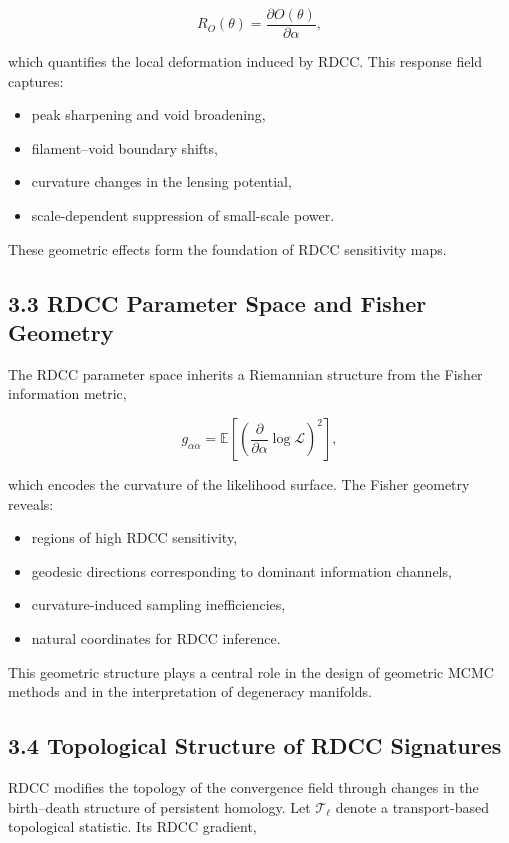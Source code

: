 \documentclass[11pt,a4paper]{article}
\begin{document}
\[
    R_{O}(\theta)
    =
    \frac{\partial O(\theta)}{\partial \alpha},
\]


which quantifies the local deformation induced by RDCC. This response field 
captures:

\begin{itemize}
    \item peak sharpening and void broadening,
    \item filament–void boundary shifts,
    \item curvature changes in the lensing potential,
    \item scale-dependent suppression of small-scale power.
\end{itemize}

These geometric effects form the foundation of RDCC sensitivity maps.

\subsection*{3.3 RDCC Parameter Space and Fisher Geometry}

The RDCC parameter space inherits a Riemannian structure from the Fisher 
information metric,


\[
    g_{\alpha\alpha}
    =
    \mathbb{E}
    \left[
        \left(
            \frac{\partial}{\partial \alpha}
            \log \mathcal{L}
        \right)^{2}
    \right],
\]


which encodes the curvature of the likelihood surface. The Fisher geometry 
reveals:

\begin{itemize}
    \item regions of high RDCC sensitivity,
    \item geodesic directions corresponding to dominant information channels,
    \item curvature-induced sampling inefficiencies,
    \item natural coordinates for RDCC inference.
\end{itemize}

This geometric structure plays a central role in the design of geometric MCMC 
methods and in the interpretation of degeneracy manifolds.

\subsection*{3.4 Topological Structure of RDCC Signatures}

RDCC modifies the topology of the convergence field through changes in the 
birth--death structure of persistent homology. Let $\mathcal{T}_{\ell}$ denote a 
transport-based topological statistic. Its RDCC gradient,
\end{document}
